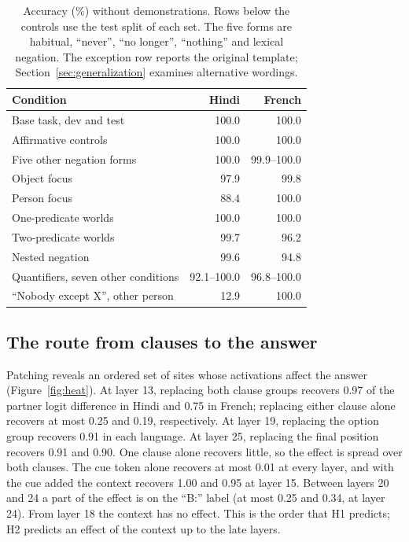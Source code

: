 \documentclass[11pt]{article}
\begin{document}
\begin{table}[t]
\small\centering
\begin{tabularx}{\linewidth}{@{}Xrr@{}}
\toprule
Condition & Hindi & French \\
\midrule
Base task, dev and test & 100.0 & 100.0 \\
Affirmative controls & 100.0 & 100.0 \\
Five other negation forms & 100.0 & 99.9--100.0 \\
Object focus & 97.9 & 99.8 \\
Person focus & 88.4 & 100.0 \\
One-predicate worlds & 100.0 & 100.0 \\
Two-predicate worlds & 99.7 & 96.2 \\
Nested negation & 99.6 & 94.8 \\
Quantifiers, seven other conditions & 92.1--100.0 & 96.8--100.0 \\
``Nobody except X'', other person & 12.9 & 100.0 \\
\bottomrule
\end{tabularx}
\caption{Accuracy (\%) without demonstrations. Rows below the controls use the test split of each set. The five forms are habitual, ``never'', ``no longer'', ``nothing'' and lexical negation. The exception row reports the original template; Section~\ref{sec:generalization} examines alternative wordings.}
\label{tab:behavior}
\end{table}

\subsection{The route from clauses to the answer}
\label{sec:route}
Patching reveals an ordered set of sites whose activations affect the answer (Figure~\ref{fig:heat}). At layer 13, replacing both clause groups recovers 0.97 of the partner logit difference in Hindi and 0.75 in French; replacing either clause alone recovers at most 0.25 and 0.19, respectively. At layer 19, replacing the option group recovers 0.91 in each language. At layer 25, replacing the final position recovers 0.91 and 0.90. One clause alone recovers little, so the effect is spread over both clauses. The cue token alone recovers at most 0.01 at every layer, and with the cue added the context recovers 1.00 and 0.95 at layer 15. Between layers 20 and 24 a part of the effect is on the ``B:'' label (at most 0.25 and 0.34, at layer 24). From layer 18 the context has no effect. This is the order that H1 predicts; H2 predicts an effect of the context up to the late layers.
\end{document}
